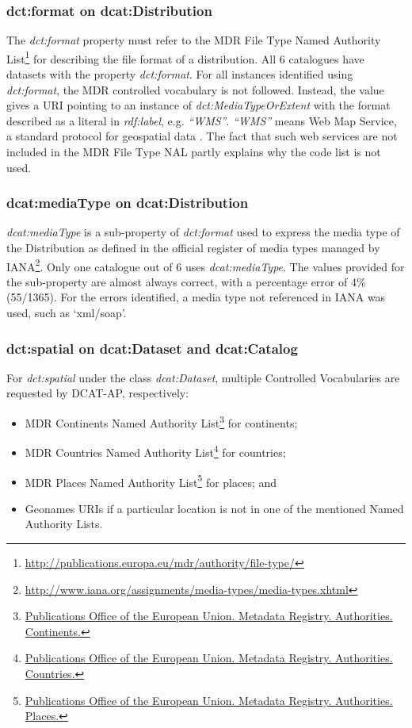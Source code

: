 \documentclass[<options>]{elsarticle}
\begin{document}
\subsubsection{dct:format on dcat:Distribution}
The \textit{dct:format} property must refer to the MDR File Type Named Authority List\footnote{\href{    http://publications.europa.eu/mdr/authority/file-type/}{http://publications.europa.eu/mdr/authority/file-type/}} for describing the file format of a distribution. All 6 catalogues have datasets with the property \textit{dct:format}. For all instances identified using \textit{dct:format}, the MDR controlled vocabulary is not followed. Instead, the value gives a URI pointing to an instance of \textit{dct:MediaTypeOrExtent} with the format described as a literal in \textit{rdf:label}, e.g. \textit{“WMS”}. \textit{“WMS”} means Web Map Service, a standard protocol for geospatial data . The fact that such web services are not included in the MDR File Type NAL partly explains why the code list is not used.

\subsubsection{dcat:mediaType on dcat:Distribution}
\textit{dcat:mediaType }is a sub-property of \textit{dct:format} used to express the media type of the Distribution as defined in the official register of media types managed by IANA\footnote{\href{http://www.iana.org/assignments/media-types/media-types.xhtml}{         http://www.iana.org/assignments/media-types/media-types.xhtml}}. Only one catalogue out of 6 uses \textit{dcat:mediaType}. The values provided for the sub-property are almost always correct, with a percentage error of 4\% (55/1365). For the errors identified, a media type not referenced in IANA was used, such as ‘xml/soap’.

\subsubsection{dct:spatial on dcat:Dataset and dcat:Catalog}
For \textit{dct:spatial} under the class \textit{dcat:Dataset}, multiple Controlled Vocabularies are requested by DCAT-AP, respectively:
\begin{itemize}
\item MDR Continents Named Authority List\footnote{\href{http://publications.europa.eu/mdr/authority/continent/
}{Publications Office of the European Union. Metadata Registry. Authorities. Continents.}} for continents;
\item MDR Countries Named Authority List\footnote{\href{http://publications.europa.eu/mdr/authority/country/}{Publications Office of the European Union. Metadata Registry. Authorities. Countries.}} for countries;
\item MDR Places Named Authority List\footnote{\href{    http://publications.europa.eu/mdr/authority/place/}{Publications Office of the European Union. Metadata Registry. Authorities. Places.}} for places; and
\item Geonames URIs if a particular location is not in one of the mentioned Named Authority Lists.
\end{itemize}
\end{document}
